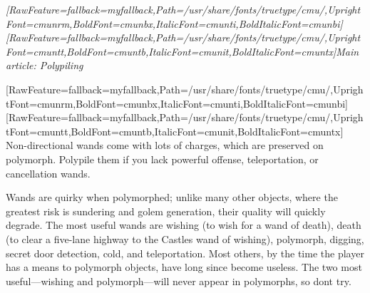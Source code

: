 \begin{myquote}
\item{}{\itshape \allowbreak{}\setmainfont{cmunti.ttf}[RawFeature={fallback=myfallback},Path=/usr/share/fonts/truetype/cmu/,UprightFont=cmunrm,BoldFont=cmunbx,ItalicFont=cmunti,BoldItalicFont=cmunbi]\setmonofont{cmunti.ttf}[RawFeature={fallback=myfallback},Path=/usr/share/fonts/truetype/cmu/,UprightFont=cmuntt,BoldFont=cmuntb,ItalicFont=cmunit,BoldItalicFont=cmuntx]\itshape Main article: Polypiling\footnotemark[179]}
\end{myquote}
\allowbreak{}\setmainfont{cmunrm.ttf}[RawFeature={fallback=myfallback},Path=/usr/share/fonts/truetype/cmu/,UprightFont=cmunrm,BoldFont=cmunbx,ItalicFont=cmunti,BoldItalicFont=cmunbi]\setmonofont{cmunrm.ttf}[RawFeature={fallback=myfallback},Path=/usr/share/fonts/truetype/cmu/,UprightFont=cmuntt,BoldFont=cmuntb,ItalicFont=cmunit,BoldItalicFont=cmuntx]
Non-{}directional wands come with lots of charges, which are preserved on polymorph. Polypile them if you lack powerful offense, teleportation, or cancellation wands.


Wands are quirky when polymorphed; unlike many other objects, where the greatest risk is sundering and golem generation, their quality will quickly degrade. The most useful wands are wishing (to wish for a wand of death), death (to clear a five-{}lane highway to the Castle\footnotemark[180]\textquotesingle{}s wand of wishing), polymorph, digging, secret door detection, cold, and teleportation. Most others, by the time the player has a means to polymorph objects, have long since become useless. The two most useful{\mbox{$\text{---}$}}wishing and polymorph{\mbox{$\text{---}$}}will never appear in polymorphs, so don\textquotesingle{}t try.


